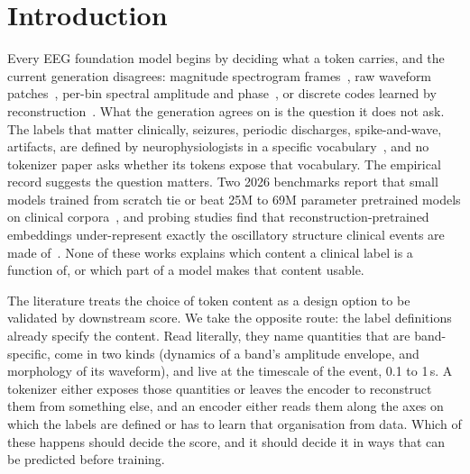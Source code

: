 \section{Introduction}
\label{sec:intro}

Every EEG foundation model begins by deciding what a token carries, and the current generation disagrees: magnitude spectrogram frames~\cite{yang2023biot,pradeepkumar2026tfm}, raw waveform patches~\cite{wang2025cbramod,wang2024eegpt,elouahidi2025reve}, per-bin spectral amplitude and phase~\cite{jiang2024labram}, or discrete codes learned by reconstruction~\cite{ma2025codebrain,sukhbaatar2026bandvq}. What the generation agrees on is the question it does not ask. The labels that matter clinically, seizures, periodic discharges, spike-and-wave, artifacts, are defined by neurophysiologists in a specific vocabulary~\cite{hirsch2021acns}, and no tokenizer paper asks whether its tokens expose that vocabulary. The empirical record suggests the question matters. Two 2026 benchmarks report that small models trained from scratch tie or beat 25M to 69M parameter pretrained models on clinical corpora~\cite{liu2026compass,kontras2026neuroatlas}, and probing studies find that reconstruction-pretrained embeddings under-represent exactly the oscillatory structure clinical events are made of~\cite{kommineni2026aperiodic,tang2026what}. None of these works explains which content a clinical label is a function of, or which part of a model makes that content usable.

The literature treats the choice of token content as a design option to be validated by downstream score. We take the opposite route: the label definitions already specify the content. Read literally, they name quantities that are band-specific, come in two kinds (dynamics of a band's amplitude envelope, and morphology of its waveform), and live at the timescale of the event, 0.1 to 1\,s. A tokenizer either exposes those quantities or leaves the encoder to reconstruct them from something else, and an encoder either reads them along the axes on which the labels are defined or has to learn that organisation from data. Which of these happens should decide the score, and it should decide it in ways that can be predicted before training.

